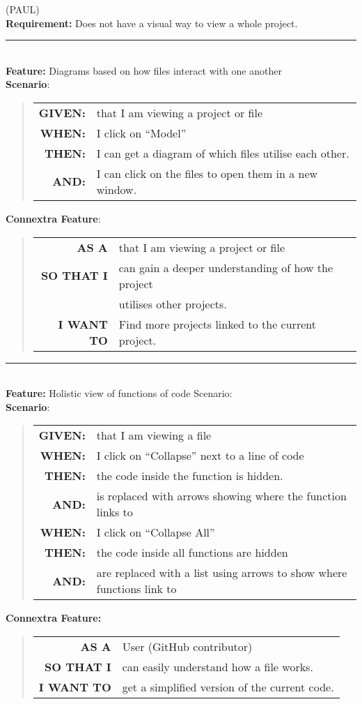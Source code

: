 \documentclass[12pt]{article}
\newcommand{\Requirement}[1] {
   \noindent \textbf{Requirement:} #1
}
\newcommand{\Feature}[1]{ 
   \noindent \textbf{Feature:} #1
}
\newcommand{\CFeature}[4]{
\noindent \textbf{Connextra Feature:}
	\begin{quote}
	\begin{tabular}{rl}
	\textbf{AS A} & #1\\
	\textbf{SO THAT \uppercase{#2}} & #3\\
	\textbf{\uppercase{#2} WANT TO} & #4  
	\end{tabular}
	\end{quote}
}
\newcommand{\GivenSc} {
	\noindent \textbf{GIVEN:}
	}
\newcommand{\WhenSc} {
	\noindent \textbf{WHEN:}
	}
\newcommand{\AndSc} {
	\noindent \textbf{AND:}
	}
\newcommand{\ThenSc} {
	\noindent \textbf{THEN:}
	}
\begin{document}
\pagebreak
\begin{framed}
(PAUL)\\
\Requirement{Does not have a visual way to view a whole project.}\\[0.2cm]

\hrule~\\

\Feature{Diagrams based on how files interact with one another}\\[0.2cm]

\noindent \textbf{Scenario}:
\begin{quote}
\begin{tabular}{rl}
\GivenSc & that I am viewing a project or file\\
\WhenSc & I click on “Model”\\
\ThenSc & I can get a diagram of which files utilise each other.\\
\AndSc & I can click on the files to open them in a new window.
\end{tabular}
\end{quote}

\noindent \textbf{Connextra Feature}:
\begin{quote}
\begin{tabular}{rl}
\textbf{AS A}      & that I am viewing a project or file\\
\textbf{SO THAT I} & can gain a deeper understanding of how the project\\
                   & utilises other projects.\\
\textbf{I WANT TO} & Find more projects linked to the current project.
\end{tabular}
\end{quote}

\hrule~\\

\Feature{ Holistic view of functions of code
Scenario:}\\[0.2cm]

\noindent \textbf{Scenario}:
\begin{quote}
\begin{tabular}{rl}
\GivenSc & that I am viewing a file\\
\WhenSc & I click on ``Collapse'' next to a line of code\\
\ThenSc & the code inside the function is hidden.\\
\AndSc & is replaced with arrows showing where the function links to\\
\WhenSc & I click on ``Collapse All''\\
\ThenSc & the code inside all functions are hidden\\
\AndSc & are replaced with a list using arrows to show where functions link to
\end{tabular}
\end{quote}

\noindent \CFeature{User (\textsf{GitHub} contributor)}{I}{can easily understand how a file works.}{get a simplified version of the current code.}
\end{framed}
\end{document}
